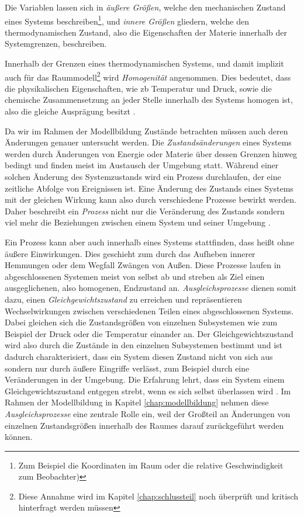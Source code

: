 Die Variablen lassen sich in \textit{äußere Größen}, welche den mechanischen Zustand eines Systems beschreiben\footnote{Zum Beispiel die Koordinaten im Raum oder die relative Geschwindigkeit zum Beobachter)}, und \textit{innere Größen} gliedern, welche den thermodynamischen Zustand, also die Eigenschaften der Materie innerhalb der Systemgrenzen, beschreiben\cite[S.13~f.]{ba12}.

Innerhalb der Grenzen eines thermodynamischen Systems, und damit implizit auch für das Raummodell\footnote{Diese Annahme wird im Kapitel \ref{chap:schlussteil} noch überprüft und kritisch hinterfragt werden müssen} wird \textit{Homogenität} angenommen. Dies bedeutet, dass die physikalischen Eigenschaften, wie \acrlong{zb} Temperatur und Druck, sowie die chemische Zusammensetzung an jeder Stelle innerhalb des Systems homogen ist, also die gleiche Ausprägung besitzt \cite[S.15]{ba12}.

Da wir im Rahmen der Modellbildung Zustände betrachten müssen auch deren Änderungen genauer untersucht werden. Die \textit{Zustandsänderungen} eines Systems werden durch Änderungen von Energie oder Materie über dessen Grenzen hinweg bedingt und finden meist im Austausch der Umgebung statt. Während einer solchen Änderung des Systemzustands wird ein Prozess durchlaufen, der eine zeitliche Abfolge von Ereignissen ist. Eine Änderung des Zustands eines Systems mit der gleichen Wirkung kann also durch verschiedene Prozesse bewirkt werden. Daher beschreibt ein \textit{Prozess} nicht nur die Veränderung des Zustands sondern viel mehr die Beziehungen zwischen einem System und seiner Umgebung \cite[S.21~f.]{ba12}.

Ein Prozess kann aber auch innerhalb eines Systems stattfinden, dass heißt ohne äußere Einwirkungen. Dies geschieht zum durch das Aufheben innerer Hemmungen oder dem Wegfall Zwängen von Außen. Diese Prozesse laufen in abgeschlossenen Systemen meist von selbst ab und streben als Ziel einen ausgeglichenen, also homogenen, Endzustand an. \textit{Ausgleichsprozesse} dienen somit dazu, einen \textit{Gleichgewichtszustand} zu erreichen und repräsentieren Wechselwirkungen zwischen verschiedenen Teilen eines abgeschlossenen Systems. Dabei gleichen sich die Zustandsgrößen von einzelnen Subsystemen wie zum Beispiel der Druck oder die Temperatur einander an. Der Gleichgewichtszustand wird also durch die Zustände in den einzelnen Subsystemen bestimmt und ist dadurch charakterisiert, dass ein System diesen Zustand nicht von sich aus sondern nur durch äußere Eingriffe verlässt, zum Beispiel durch eine Veränderungen in der Umgebung. Die Erfahrung lehrt, dass ein System einem Gleichgewichtszustand entgegen strebt, wenn es sich selbst überlassen wird \cite[S.22~f.]{ba12}.
Im Rahmen der Modellbildung in Kapitel \ref{chap:modellbildung} nehmen diese \textit{Ausgleichsprozesse} eine zentrale Rolle ein, weil der Großteil an Änderungen von einzelnen Zustandsgrößen innerhalb des Raumes darauf zurückgeführt werden können. 

